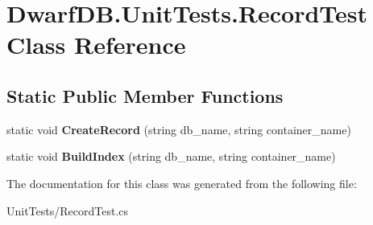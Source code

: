 \hypertarget{class_dwarf_d_b_1_1_unit_tests_1_1_record_test}{\section{Dwarf\+D\+B.\+Unit\+Tests.\+Record\+Test Class Reference}
\label{class_dwarf_d_b_1_1_unit_tests_1_1_record_test}
}
\subsection*{Static Public Member Functions}
\begin{DoxyCompactItemize}
\item 
\hypertarget{class_dwarf_d_b_1_1_unit_tests_1_1_record_test_a907b0948a207c3deb0d62b1df26bf1f6}{static void {\bfseries Create\+Record} (string db\+\_\+name, string container\+\_\+name)}\label{class_dwarf_d_b_1_1_unit_tests_1_1_record_test_a907b0948a207c3deb0d62b1df26bf1f6}

\item 
\hypertarget{class_dwarf_d_b_1_1_unit_tests_1_1_record_test_af544fca880eb0a0bf19e6e0728c92c64}{static void {\bfseries Build\+Index} (string db\+\_\+name, string container\+\_\+name)}\label{class_dwarf_d_b_1_1_unit_tests_1_1_record_test_af544fca880eb0a0bf19e6e0728c92c64}

\end{DoxyCompactItemize}


The documentation for this class was generated from the following file\+:\begin{DoxyCompactItemize}
\item 
Unit\+Tests/Record\+Test.\+cs\end{DoxyCompactItemize}
